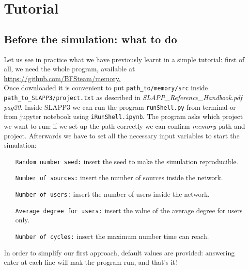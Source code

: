 \section{Tutorial}\label{sec:tutorial}
\subsection{Before the simulation: what to do}\label{subsec:before}
Let us see in practice what we have previously learnt in a simple tutorial:
first of all, we need the whole program, available at \url{https://github.com/BFSteam/memory.}\\
Once downloaded it is convenient to put \texttt{path\_to/memory/src} inside
\texttt{path\_to\_SLAPP3/project.txt} as described in \textit{SLAPP\_Reference\_Handbook.pdf pag20}.
Inside SLAPP3 we can run the program \texttt{runShell.py} from terminal
or from jupyter notebook using \texttt{iRunShell.ipynb}.
The program asks which project we want to run: if we set up the path correctly
we can confirm \textit{memory} path and project.
Afterwards we have to set all the necessary input variables to start
the simulation:
\begin{itemize}
\item[\texttt{Random number seed:}] insert the seed to make the simulation reproducible.
\item[\texttt{Number of sources:}]insert the number of sources inside the network.
\item[\texttt{Number of users:}]insert the number of users inside the network.
\item[\texttt{Average degree for users:}]insert the value of the average degree for users only.
\item[\texttt{Number of cycles:}]insert the maximum number time can reach.
\end{itemize}

In order to simplify our first approach, default values are provided:
answering enter at each line will mak the program run, and that's it!\\

